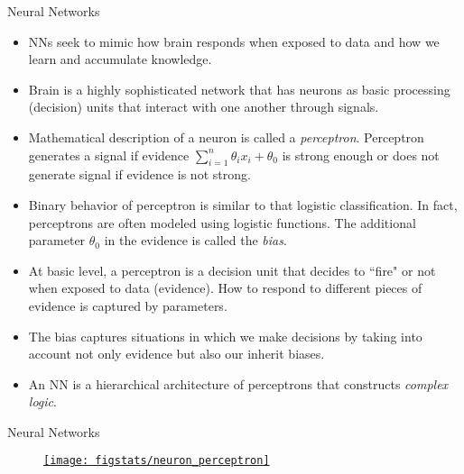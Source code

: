 \documentclass[9pt]{beamer}
\begin{document}

\begin{frame}{Neural Networks}

\begin{itemize}
\item NNs seek to mimic how  brain responds when exposed to data and how we learn and accumulate knowledge. 

\item Brain is a highly sophisticated network that has neurons as basic processing (decision) units that interact with one another through signals. 

\item  Mathematical description of a neuron is called a {\em perceptron}. Perceptron generates a signal if evidence $\sum_{i=1}^n\theta_ix_i+\theta_0$ is strong enough or does not generate signal if evidence is not strong. 

\item Binary behavior of perceptron is similar to that logistic classification. In fact, perceptrons are often modeled using logistic functions. The additional parameter $\theta_0$ in the evidence is called the {\em bias}. 

\item At basic level, a perceptron is a decision unit that decides to ``fire" or not when exposed to data (evidence). How to respond to different pieces of evidence is captured by parameters.   

\item The bias captures situations in which we make decisions by taking into account not only evidence but also our inherit biases. 
 
\item An NN is a hierarchical architecture of perceptrons that constructs {\em complex logic}. 
\end{itemize}

\end{frame}


\begin{frame}{Neural Networks}

\begin{figure}[!htb]
    \centering
	\href{http://dataskunkworks.com/2018/03/22/building-an-artificial-neuron-in-python-the-perceptron}{\texttt{[image: figstats/neuron\_perceptron]}}
\end{figure}

\end{frame}
\end{document}
